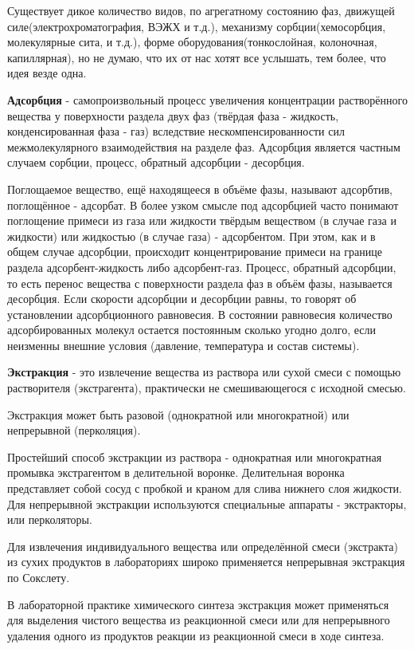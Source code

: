 \documentclass[14pt,a4paper]{scrartcl}
\begin{document}
Существует дикое количество видов, по агрегатному состоянию фаз, движущей силе(электрохроматография, ВЭЖХ и т.д.), механизму сорбции(хемосорбция, молекулярные сита, и т.д.), форме оборудования(тонкослойная, колоночная, капиллярная), но не думаю, что их от нас хотят все услышать, тем более, что идея везде одна.

\textbf{Адсорбция} -  самопроизвольный процесс увеличения концентрации растворённого вещества у поверхности раздела двух фаз (твёрдая фаза - жидкость, конденсированная фаза - газ) вследствие нескомпенсированности сил межмолекулярного взаимодействия на разделе фаз. Адсорбция является частным случаем сорбции, процесс, обратный адсорбции - десорбция.

Поглощаемое вещество, ещё находящееся в объёме фазы, называют адсорбтив, поглощённое - адсорбат. В более узком смысле под адсорбцией часто понимают поглощение примеси из газа или жидкости твёрдым веществом (в случае газа и жидкости) или жидкостью (в случае газа) - адсорбентом. При этом, как и в общем случае адсорбции, происходит концентрирование примеси на границе раздела адсорбент-жидкость либо адсорбент-газ. Процесс, обратный адсорбции, то есть перенос вещества с поверхности раздела фаз в объём фазы, называется десорбция. Если скорости адсорбции и десорбции равны, то говорят об установлении адсорбционного равновесия. В состоянии равновесия количество адсорбированных молекул остается постоянным сколько угодно долго, если неизменны внешние условия (давление, температура и состав системы).

\textbf{Экстракция} - это извлечение вещества из раствора или сухой смеси с помощью растворителя (экстрагента), практически не смешивающегося с исходной смесью.

Экстракция может быть разовой (однократной или многократной) или непрерывной (перколяция).

Простейший способ экстракции из раствора - однократная или многократная промывка экстрагентом в делительной воронке. Делительная воронка представляет собой сосуд с пробкой и краном для слива нижнего слоя жидкости. Для непрерывной экстракции используются специальные аппараты - экстракторы, или перколяторы.

Для извлечения индивидуального вещества или определённой смеси (экстракта) из сухих продуктов в лабораториях широко применяется непрерывная экстракция по Сокслету.

В лабораторной практике химического синтеза экстракция может применяться для выделения чистого вещества из реакционной смеси или для непрерывного удаления одного из продуктов реакции из реакционной смеси в ходе синтеза.
\end{document}
